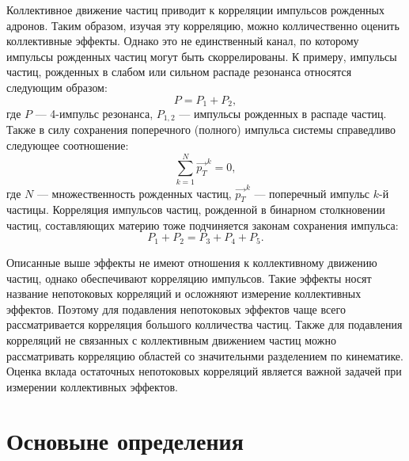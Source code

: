 Коллективное движение частиц приводит к корреляции импульсов рожденных адронов.
Таким образом, изучая эту корреляцию, можно колличественно оценить коллективные эффекты.
Однако это не единственный канал, по которому импульсы рожденных частиц могут быть скоррелированы.
К примеру, импульсы частиц, рожденных в слабом или сильном распаде резонанса относятся следующим образом:
%
\begin{equation}
    P = P_1 + P_2,
\end{equation}
где $P$ --- 4-импульс резонанса, $P_{1,2}$ --- импульсы рожденных в распаде частиц.
Также в силу сохранения поперечного (полного) импульса системы справедливо следующее соотношение:
%
\begin{equation}
    \sum_{k=1}^{N} \vec{p_T}^k = 0,
\end{equation}
где $N$ --- множественность рожденных частиц, $\vec{p_{T}}^k$ --- поперечный импульс $k$-й частицы.
Корреляция импульсов частиц, рожденной в бинарном столкновении частиц, составляющих материю тоже подчиняется законам сохранения импульса:
%
\begin{equation}
    P_1 + P_2 = P_3 + P_4 + P_5.
\end{equation}

Описанные выше эффекты не имеют отношения к коллективному движению частиц, однако обеспечивают корреляцию импульсов.
Такие эффекты носят название непотоковых корреляций и осложняют измерение коллективных эффектов.
Поэтому для подавления непотоковых эффектов чаще всего рассматривается корреляция большого колличества частиц.
Также для подавления корреляций не связанных с коллективным движением частиц можно рассматривать корреляцию областей со значительнми разделением по кинематике.
Оценка вклада остаточных непотоковых корреляций является важной задачей при измерении коллективных эффектов.

\section{Основыне определения}

